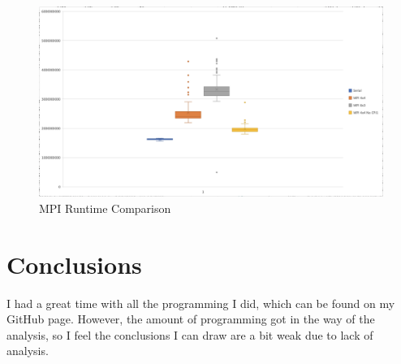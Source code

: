 \documentclass[11pt, a4paper]{article} %
\begin{document}
\begin{figure}
  \includegraphics[width=\linewidth]{MPIRuntimeComparisons.png}
  \caption{MPI Runtime Comparison}
  \label{fig:MPIComparison}
\end{figure}

\section{Conclusions}
I had a great time with all the programming I did, which can be found on my GitHub page. However, the amount of programming got in the way of the analysis, so I feel the conclusions I can draw are a bit weak due to lack of analysis.  

\newpage %

%



\newpage %
\end{document}

